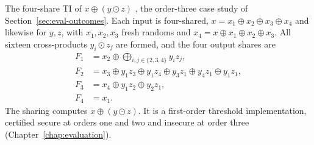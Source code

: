 The four-share TI of $x \oplus (y \odot z)$ \parencite{bilgin2015threshold}, the
order-three case study of Section~\ref{sec:eval-outcomes}. Each input is
four-shared, $x = x_1 \oplus x_2 \oplus x_3 \oplus x_4$ and likewise for $y, z$,
with $x_1, x_2, x_3$ fresh randoms and $x_4 = x \oplus x_1 \oplus x_2 \oplus x_3$.
All sixteen cross-products $y_i \odot z_j$ are formed, and the four output shares
are
\[
\begin{aligned}
  F_1 &= x_2 \oplus \bigoplus_{i,j \in \{2,3,4\}} y_i z_j, \\
  F_2 &= x_3 \oplus y_1 z_3 \oplus y_1 z_4 \oplus y_3 z_1 \oplus y_4 z_1 \oplus y_1 z_1, \\
  F_3 &= x_4 \oplus y_1 z_2 \oplus y_2 z_1, \\
  F_4 &= x_1.
\end{aligned}
\]
The sharing computes $x \oplus (y \odot
z)$. It is a first-order threshold implementation, certified secure at orders one
and two and insecure at order three (Chapter~\ref{chap:evaluation}).
